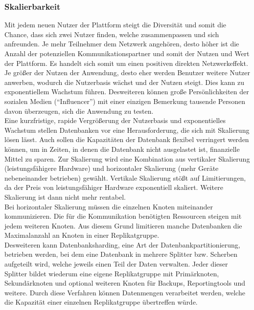 \subsubsection{Skalierbarkeit}
Mit jedem neuen Nutzer der Plattform steigt die Diversität und somit die Chance, dass sich zwei Nutzer finden, welche zusammenpassen und sich anfreunden.
 Je mehr Teilnehmer dem Netzwerk angehören, desto höher ist die Anzahl der potenziellen Kommunikationspartner und somit der Nutzen und Wert der Plattform.
Es handelt sich somit um einen positiven direkten Netzwerkeffekt. \cite{db:networkEffect}
Je größer der Nutzen der Anwendung, desto eher werden Benutzer weitere Nutzer anwerben, wodurch die Nutzerbasis wächst und der Nutzen steigt.
Dies kann zu exponentiellem Wachstum führen. \cite{db:networkEffectExponential}
Desweiteren können große Persönlichkeiten der sozialen Medien (\enquote{Influencer}) mit einer einzigen Bemerkung tausende Personen davon überzeugen, sich die Anwendung zu testen. \\
Eine kurzfristige, rapide Vergrößerung der Nutzerbasis und exponentielles Wachstum stellen Datenbanken vor eine Herausforderung, die sich mit Skalierung lösen lässt.
Auch sollen die Kapazitäten der Datenbank flexibel verringert werden können, um in Zeiten, in denen die Datenbank nicht ausgelastet ist, finanzielle Mittel zu sparen.
Zur Skalierung wird eine Kombination aus vertikaler Skalierung (leistungsfähigere Hardware) und horizontaler Skalierung (mehr Geräte nebeneinander betrieben) gewählt.
Vertikale Skalierung stößt auf Limitierungen, da der Preis von leistungsfähiger Hardware exponentiell skaliert. \cite{db:verticalScaling}
Weitere Skalierung ist dann nicht mehr rentabel. \\
Bei horizontaler Skalierung müssen die einzelnen Knoten miteinander kommunizieren.
Die für die Kommunikation benötigten Ressourcen steigen mit jedem weiteren Knoten.
Aus diesem Grund limitieren manche Datenbanken die Maximalanzahl an Knoten in einer Replikatgruppe. \cite{db:mongoReplicaSetElections}\\
Desweiteren kann Datenbanksharding, eine Art der Datenbankpartitionierung, betrieben werden, bei dem eine Datenbank in mehrere Splitter bzw. Scherben aufgeteilt wird, welche jeweils einen Teil der Daten verwalten.
Jeder dieser Splitter bildet wiederum eine eigene Replikatgruppe mit Primärknoten, Sekundärknoten und optional weiteren Knoten für Backups, Reportingtools und weitere. \cite{db:mongoHiddenReplicaSetMembers} \cite{db:mongoDelayedReplicaSetMembers} \cite{db:mongoReplicaSetArbiter}
Durch diese Verfahren können Datenmengen verarbeitet werden, welche die Kapazität einer einzelnen Replikatgruppe übertreffen würde. \cite{db:sharding}

